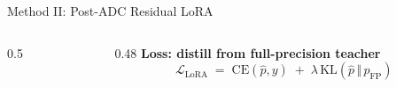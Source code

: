 \begin{frame}[shrink=10]{Method II: Post-ADC Residual LoRA}
\begin{columns}[T]
\begin{column}{0.5\textwidth}
\begin{center}
{}
      \end{center}
    \end{column}

    \begin{column}{0.48\textwidth}
      \vspace*{1.4cm}
      \footnotesize
      \textbf{Loss: distill from full-precision teacher}
      \[
        \mathcal L_{\mathrm{LoRA}} \;=\; \mathrm{CE}(\hat p, y) \;+\; \lambda\,\mathrm{KL}\!\left(\hat p\,\Vert\, p_{\mathrm{FP}}\right)
      \]

    \end{column}
  \end{columns}
\end{frame}
